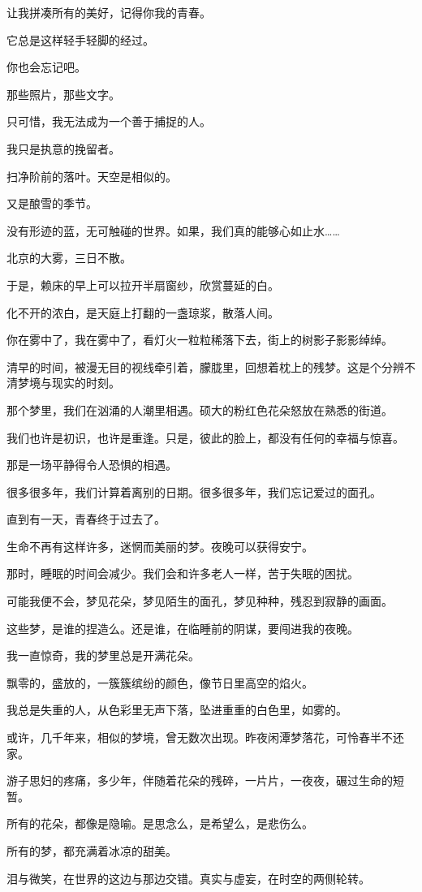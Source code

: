 		让我拼凑所有的美好，记得你我的青春。\par
		它总是这样轻手轻脚的经过。

		你也会忘记吧。\par
		那些照片，那些文字。\par
		只可惜，我无法成为一个善于捕捉的人。\par
		我只是执意的挽留者。

		扫净阶前的落叶。天空是相似的。\par
		又是酿雪的季节。

	\endwriting



		没有形迹的蓝，无可触碰的世界。如果，我们真的能够心如止水……

		北京的大雾，三日不散。\par
		于是，赖床的早上可以拉开半扇窗纱，欣赏蔓延的白。\par
		化不开的浓白，是天庭上打翻的一盏琼浆，散落人间。\par
		你在雾中了，我在雾中了，看灯火一粒粒稀落下去，街上的树影子影影绰绰。\par
		清早的时间，被漫无目的视线牵引着，朦胧里，回想着枕上的残梦。这是个分辨不清梦境与现实的时刻。

		那个梦里，我们在汹涌的人潮里相遇。硕大的粉红色花朵怒放在熟悉的街道。\par
		我们也许是初识，也许是重逢。只是，彼此的脸上，都没有任何的幸福与惊喜。\par
		那是一场平静得令人恐惧的相遇。\par
		很多很多年，我们计算着离别的日期。很多很多年，我们忘记爱过的面孔。\par
		直到有一天，青春终于过去了。\par
		生命不再有这样许多，迷惘而美丽的梦。夜晚可以获得安宁。\par
		那时，睡眠的时间会减少。我们会和许多老人一样，苦于失眠的困扰。\par
		可能我便不会，梦见花朵，梦见陌生的面孔，梦见种种，残忍到寂静的画面。

		这些梦，是谁的捏造么。还是谁，在临睡前的阴谋，要闯进我的夜晚。\par
		我一直惊奇，我的梦里总是开满花朵。\par
		飘零的，盛放的，一簇簇缤纷的颜色，像节日里高空的焰火。\par
		我总是失重的人，从色彩里无声下落，坠进重重的白色里，如雾的。\par
		或许，几千年来，相似的梦境，曾无数次出现。昨夜闲潭梦落花，可怜春半不还家。\par
		游子思妇的疼痛，多少年，伴随着花朵的残碎，一片片，一夜夜，碾过生命的短暂。\par
		所有的花朵，都像是隐喻。是思念么，是希望么，是悲伤么。\par
		所有的梦，都充满着冰凉的甜美。\par
		泪与微笑，在世界的这边与那边交错。真实与虚妄，在时空的两侧轮转。

